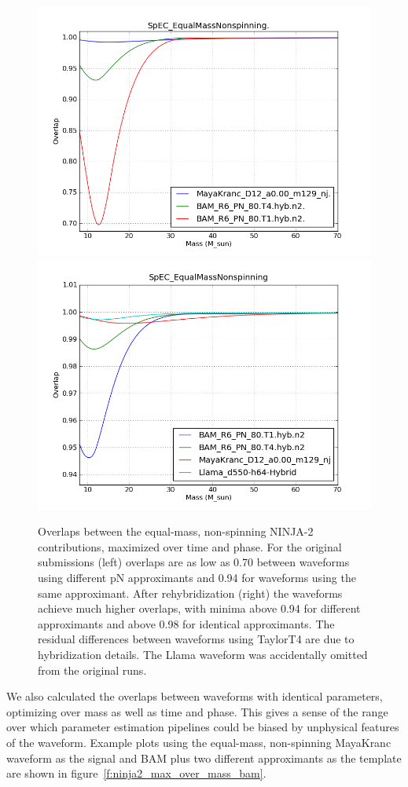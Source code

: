 \begin{figure}
  \includegraphics[width=0.5\linewidth]{figures/ninja2/q_1_z_0_figure03}
  \includegraphics[width=0.5\linewidth]{figures/ninja2/figure2_1_0_16}
  \caption[Overlaps between NINJA-2 submissions maximized over time
and phase]{
  \label{f:ninja2_overlap_test}
Overlaps between the equal-mass, non-spinning NINJA-2 contributions,
maximized over time and phase.   For the original submissions (left)
overlaps are as low as 0.70 between waveforms using different pN
approximants and 0.94 for waveforms using the same approximant.  After
rehybridization (right) the waveforms achieve much higher overlaps,
with minima above 0.94 for different approximants and above 0.98 for
identical approximants.  The residual differences  between waveforms
using TaylorT4 are due to hybridization details.  The Llama waveform
was accidentally omitted from the original runs.}
\end{figure}%

We also calculated the overlaps between waveforms with identical
parameters, optimizing over mass as well as time and phase.  This gives
a sense of the range over which parameter estimation pipelines could 
be biased by unphysical features of the waveform.  Example plots
using the equal-mass, non-spinning MayaKranc waveform as the signal and
BAM plus two different approximants as the template are shown in 
figure~\ref{f:ninja2_max_over_mass_bam}.


